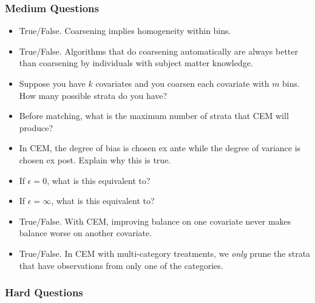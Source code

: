 \documentclass[11pt]{article}
\begin{document}
\subsubsection{Medium Questions}


\begin{itemize}
\item True/False.  Coarsening implies homogeneity within bins.

\item True/False.  Algorithms that do coarsening automatically are always better than coarsening by individuals with subject matter knowledge.

\item Suppose you have $k$ covariates and you coarsen each covariate with $m$ bins.  How many possible strata do you have?

\item Before matching, what is the maximum number of strata that CEM will produce?

\item In CEM, the degree of bias is chosen ex ante while the degree of variance is chosen ex post.  Explain why this is true.

\item If $\epsilon = 0$, what is this equivalent to?

\item If $\epsilon = \infty$, what is this equivalent to?

\item True/False.  With CEM, improving balance on one covariate never makes balance worse on another covariate.

\item True/False.  In CEM with multi-category treatments, we \textit{only} prune the strata that have observations from only one of the categories.

\end{itemize}

\subsubsection{Hard Questions}
\end{document}
